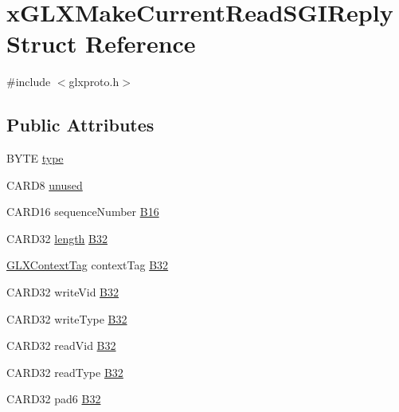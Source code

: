 \hypertarget{structx_g_l_x_make_current_read_s_g_i_reply}{}\section{x\+G\+L\+X\+Make\+Current\+Read\+S\+G\+I\+Reply Struct Reference}
\label{structx_g_l_x_make_current_read_s_g_i_reply}


{\ttfamily \#include $<$glxproto.\+h$>$}

\subsection*{Public Attributes}
\begin{DoxyCompactItemize}
\item 
B\+Y\+TE \hyperlink{structx_g_l_x_make_current_read_s_g_i_reply_a6b6cb74fa1203f0ef84a3434cd4d8e40}{type}
\item 
C\+A\+R\+D8 \hyperlink{structx_g_l_x_make_current_read_s_g_i_reply_aa32d9a9a4741fb503152f251aaa3bf21}{unused}
\item 
C\+A\+R\+D16 sequence\+Number \hyperlink{structx_g_l_x_make_current_read_s_g_i_reply_adc9b09a985d368b5bdfa2b8cee801356}{B16}
\item 
C\+A\+R\+D32 \hyperlink{glcorearb_8h_ab9c919755bde3b34349e23a32b4e0fa7}{length} \hyperlink{structx_g_l_x_make_current_read_s_g_i_reply_a69873aa150e6184858623740c714d866}{B32}
\item 
\hyperlink{glxproto_8h_ae71763ce00c9fa460beb4699af678691}{G\+L\+X\+Context\+Tag} context\+Tag \hyperlink{structx_g_l_x_make_current_read_s_g_i_reply_a979a83345b241ebf9c5a393a07f19bde}{B32}
\item 
C\+A\+R\+D32 write\+Vid \hyperlink{structx_g_l_x_make_current_read_s_g_i_reply_ac6fe3dbe9ea8a4159d56c388919cacc4}{B32}
\item 
C\+A\+R\+D32 write\+Type \hyperlink{structx_g_l_x_make_current_read_s_g_i_reply_a0e654f315b5abca515fa39e36b3fe737}{B32}
\item 
C\+A\+R\+D32 read\+Vid \hyperlink{structx_g_l_x_make_current_read_s_g_i_reply_acac818ba9392b75a4d4eba0d0552ca62}{B32}
\item 
C\+A\+R\+D32 read\+Type \hyperlink{structx_g_l_x_make_current_read_s_g_i_reply_ac6c05d8735019b836597c8afc3221867}{B32}
\item 
C\+A\+R\+D32 pad6 \hyperlink{structx_g_l_x_make_current_read_s_g_i_reply_a44f01f9523c2509d6b3d8bab90ccbeea}{B32}
\end{DoxyCompactItemize}


